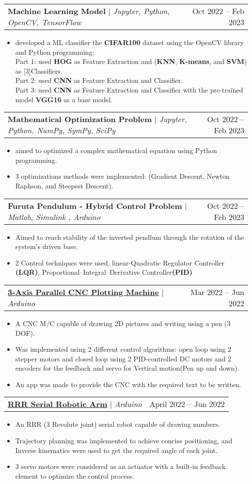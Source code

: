\documentclass[letterpaper,11pt]{article}
\makeatletter
\newcommand{\resumeItem}[1]{
  \item\small{
    {#1 \vspace{-2pt}}
  }
}
\newcommand{\resumeProjectHeading}[2]{
    \item
    \begin{tabular*}{0.97\textwidth}{l@{\extracolsep{\fill}}r}
      \small#1 & #2 \\
    \end{tabular*}\vspace{-7pt}
}
\newcommand{\resumeItemListStart}{\begin{itemize}}
\newcommand{\resumeItemListEnd}{\end{itemize}\vspace{-5pt}}
\makeatother
\begin{document}
      \resumeProjectHeading
        {\textbf{Machine Learning Model} $|$ \emph{Jupyter, Python, OpenCV, TensorFlow}}{Oct 2022 -- Feb 2023}
        \resumeItemListStart
          \resumeItem{developed a ML classifier the \textbf{CIFAR100} dataset using the OpenCV library and Python programming:\\
          Part 1: used \textbf{HOG} as Feature Extraction and (\textbf{KNN}, \textbf{K-means}, and \textbf{SVM}) as [3]Classifiers.\\
          Part 2: used \textbf{CNN} as Feature Extraction and Classifier.\\
          Part 3: used \textbf{CNN} as Feature Extraction and Classifier with the pre-trained model \textbf{VGG16} as a base model.}
        \resumeItemListEnd
          
      \resumeProjectHeading
        {\textbf{Mathematical Optimization Problem} $|$ \emph{Jupyter, Python, NumPy, SymPy, SciPy}}{Oct 2022 -- Feb 2023}
        \resumeItemListStart
          \resumeItem{aimed to optimized a complex mathematical equation using Python programming.}
          \resumeItem{3 optimizations methods were implemented: (Gradient Descent, Newton Raphson, and Steepest Descent).}
        \resumeItemListEnd

      \resumeProjectHeading
      {\textbf{Furuta Pendulum - Hybrid Control Problem} $|$ \emph{Matlab, Simulink , Arduino}}{Oct 2022 -- Feb 2023}
      \resumeItemListStart
        \resumeItem{Aimed to reach stability of the inverted pendlum through the rotation of the system's driven base.}
        \resumeItem{2 Control techniques were used, linear-Quadratic Regulator Controller \textbf{(LQR)}, Proportional–Integral–Derivative Controller\textbf{(PID)}}
      \resumeItemListEnd  

      \resumeProjectHeading
        {\textbf{\href{https://github.com/MostafaQusit/CNC-Plotting-Machine}{3-Axis Parallel CNC Plotting Machine}} $|$ \emph{Arduino}}{Mar 2022 -- Jun 2022}
        \resumeItemListStart
          \resumeItem{A CNC M/C capable of drawing 2D pictures and writing using a pen (3 DOF).}
          \resumeItem{Was implemented using 2 different control algorithms: open loop using 2 stepper motors and closed loop using 2 PID-controlled DC motors and 2 encoders for the feedback and servo for Vertical motion(Pen up and down).}
          \resumeItem{An app was made to provide the CNC with the required text to be written.}
        \resumeItemListEnd

      \resumeProjectHeading
        {\textbf{\href{https://github.com/MostafaQusit/RRR-Serial-Robotic-Arm}{RRR Serial Robotic Arm}} $|$ \emph{Arduino}}{April 2022 -- Jun 2022}
        \resumeItemListStart
          \resumeItem{An RRR (3 Revolute joint) serial robot capable of drawing numbers.}
          \resumeItem{Trajectory planning was implemented to achieve concise positioning, and Inverse kinematics were used to get the required angle of each joint.}
          \resumeItem{3 servo motors were considered as an actuator with a built-in feedback element to optimize the control process.}
        \resumeItemListEnd
      
\end{document}
